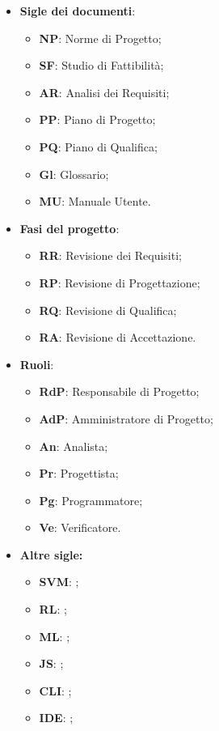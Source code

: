\documentclass[../norme-di-progetto.tex]{subfiles}
\begin{document}
\begin{itemize}
  \item \textbf{Sigle dei documenti}:
  \begin{itemize}
    \item \textbf{NP}: Norme di Progetto;
    \item \textbf{SF}: Studio di Fattibilità;
    \item \textbf{AR}: Analisi dei Requisiti;
    \item \textbf{PP}: Piano di Progetto;
    \item \textbf{PQ}: Piano di Qualifica;
    \item \textbf{Gl}: Glossario;
    \item \textbf{MU}: Manuale Utente.
  \end{itemize}
  \item \textbf{Fasi del progetto}:
  \begin{itemize}
  \item \textbf{RR}: Revisione dei Requisiti;
  \item \textbf{RP}: Revisione di Progettazione;
  \item \textbf{RQ}: Revisione di Qualifica;
  \item \textbf{RA}: Revisione di Accettazione.
  \end{itemize}
  \item \textbf{Ruoli}:
  \begin{itemize}
  \item \textbf{RdP}: Responsabile di Progetto;
  \item \textbf{AdP}: Amministratore di Progetto;
  \item \textbf{An}: Analista;
  \item \textbf{Pr}: Progettista;
  \item \textbf{Pg}: Programmatore;
  \item \textbf{Ve}: Verificatore.
  \end{itemize}
  \item \textbf{Altre sigle:}
  \begin{itemize}
    \item \textbf{SVM}: ;
    \item \textbf{RL}: ;
    \item \textbf{ML}: ;
    \item \textbf{JS}: ;
    \item \textbf{CLI}: ;
    \item \textbf{IDE}: ;
  \end{itemize}
\end{itemize}
\end{document}
